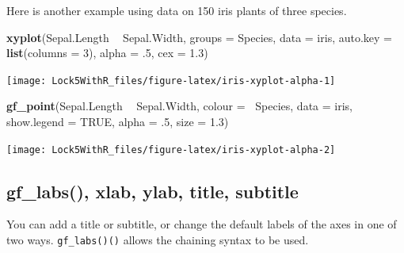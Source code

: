 \documentclass[]{book}
\newenvironment{Shaded}{\begin{snugshade}}{\end{snugshade}}
\newcommand{\DataTypeTok}[1]{\textcolor[rgb]{0.13,0.29,0.53}{#1}}
\newcommand{\DecValTok}[1]{\textcolor[rgb]{0.00,0.00,0.81}{#1}}
\newcommand{\FloatTok}[1]{\textcolor[rgb]{0.00,0.00,0.81}{#1}}
\newcommand{\KeywordTok}[1]{\textcolor[rgb]{0.13,0.29,0.53}{\textbf{#1}}}
\newcommand{\NormalTok}[1]{#1}
\newcommand{\OperatorTok}[1]{\textcolor[rgb]{0.81,0.36,0.00}{\textbf{#1}}}
\newcommand{\OtherTok}[1]{\textcolor[rgb]{0.56,0.35,0.01}{#1}}
\newcommand{\StringTok}[1]{\textcolor[rgb]{0.31,0.60,0.02}{#1}}
\begin{document}
Here is another example using data on 150 iris plants of three species.

\begin{Shaded}
\begin{Highlighting}[]
\KeywordTok{xyplot}\NormalTok{(Sepal.Length }\OperatorTok{~}\StringTok{ }\NormalTok{Sepal.Width, }\DataTypeTok{groups =}\NormalTok{ Species, }\DataTypeTok{data =}\NormalTok{ iris, }
    \DataTypeTok{auto.key =} \KeywordTok{list}\NormalTok{(}\DataTypeTok{columns =} \DecValTok{3}\NormalTok{),}
    \DataTypeTok{alpha =} \FloatTok{.5}\NormalTok{,}
    \DataTypeTok{cex =} \FloatTok{1.3}\NormalTok{)   }
\end{Highlighting}
\end{Shaded}

\texttt{[image: Lock5WithR\_files/figure-latex/iris-xyplot-alpha-1]}

\begin{Shaded}
\begin{Highlighting}[]
\KeywordTok{gf_point}\NormalTok{(Sepal.Length }\OperatorTok{~}\StringTok{ }\NormalTok{Sepal.Width, }\DataTypeTok{colour =} \OperatorTok{~}\NormalTok{Species, }\DataTypeTok{data =}\NormalTok{ iris, }
    \DataTypeTok{show.legend =} \OtherTok{TRUE}\NormalTok{,}
    \DataTypeTok{alpha =} \FloatTok{.5}\NormalTok{,}
    \DataTypeTok{size =} \FloatTok{1.3}\NormalTok{)  }
\end{Highlighting}
\end{Shaded}

\texttt{[image: Lock5WithR\_files/figure-latex/iris-xyplot-alpha-2]}

\hypertarget{gf_labs-xlab-ylab-title-subtitle}{%
\subsection{gf\_labs(), xlab, ylab, title, subtitle}\label{gf_labs-xlab-ylab-title-subtitle}}

You can add a title or subtitle, or change the default labels of the axes in one of two ways. \texttt{gf\_labs()()} allows the chaining syntax to be used.

\begin{Shaded}
\end{Shaded}
\end{document}
